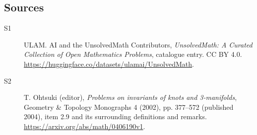 \documentclass[11pt]{article}
\begin{document}
\subsection{Sources}
\begin{description}
\item[\hypertarget{source:statement:1}{S1}] ULAM. AI and the UnsolvedMath Contributors, \emph{UnsolvedMath: A Curated Collection of Open Mathematics Problems}, catalogue entry. CC BY 4.0. \url{https://huggingface.co/datasets/ulamai/UnsolvedMath}.
\item[\hypertarget{source:statement:2}{S2}] T. Ohtsuki (editor), \emph{Problems on invariants of knots and 3-manifolds}, Geometry \& Topology Monographs 4 (2002), pp. 377--572 (published 2004), item 2.9 and its surrounding definitions and remarks. \url{https://arxiv.org/abs/math/0406190v1}.
\end{description}
\label{end:statement}
\end{document}

